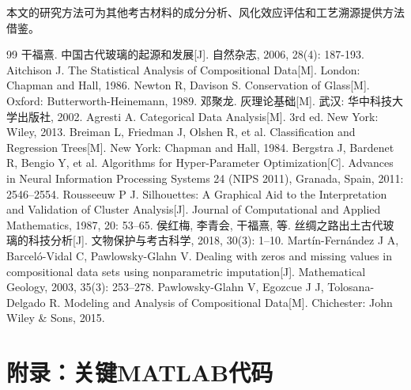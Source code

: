\documentclass[12pt,a4paper]{ctexart}
\begin{document}
本文的研究方法可为其他考古材料的成分分析、风化效应评估和工艺溯源提供方法借鉴。

\newpage

\begin{thebibliography}{99}
\setlength{\itemsep}{0pt}
 干福熹. 中国古代玻璃的起源和发展[J]. 自然杂志, 2006, 28(4): 187-193.
 Aitchison J. The Statistical Analysis of Compositional Data[M]. London: Chapman and Hall, 1986.
 Newton R, Davison S. Conservation of Glass[M]. Oxford: Butterworth-Heinemann, 1989.
 邓聚龙. 灰理论基础[M]. 武汉: 华中科技大学出版社, 2002.
 Agresti A. Categorical Data Analysis[M]. 3rd ed. New York: Wiley, 2013.
 Breiman L, Friedman J, Olshen R, et al. Classification and Regression Trees[M]. New York: Chapman and Hall, 1984.
 Bergstra J, Bardenet R, Bengio Y, et al. Algorithms for Hyper-Parameter Optimization[C]. Advances in Neural Information Processing Systems 24 (NIPS 2011), Granada, Spain, 2011: 2546--2554.
 Rousseeuw P J. Silhouettes: A Graphical Aid to the Interpretation and Validation of Cluster Analysis[J]. Journal of Computational and Applied Mathematics, 1987, 20: 53--65.
 侯红梅, 李青会, 干福熹, 等. 丝绸之路出土古代玻璃的科技分析[J]. 文物保护与考古科学, 2018, 30(3): 1--10.
 Mart\'{i}n-Fern\'{a}ndez J A, Barcel\'{o}-Vidal C, Pawlowsky-Glahn V. Dealing with zeros and missing values in compositional data sets using nonparametric imputation[J]. Mathematical Geology, 2003, 35(3): 253--278.
 Pawlowsky-Glahn V, Egozcue J J, Tolosana-Delgado R. Modeling and Analysis of Compositional Data[M]. Chichester: John Wiley \& Sons, 2015.
\end{thebibliography}

\newpage

\section*{附录：关键MATLAB代码}
\end{document}
